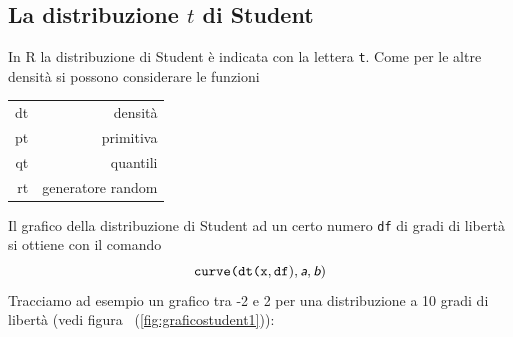 \documentclass[onecolumn,11pt]{book}
\newcommand{\varia}[1]{\textsl{\textsf{#1}}}
\begin{document}
\subsection{La distribuzione $t$ di Student}
In \textsf{R} la distribuzione di Student \`e indicata con la lettera  \texttt{t}.  Come per le altre densit\`a  si possono considerare le funzioni\vskip5pt
\begin{tabular}{|r|r |}
\hline
dt  &densit\`a\\
pt  &primitiva\\
qt & quantili\\
rt  &generatore random\\
\hline
\end{tabular}
\vskip10pt
Il grafico della distribuzione di Student ad un certo numero \texttt{df} di gradi di libert\`a  si ottiene con il comando
\begin{equation*}
\texttt{curve(dt(x},\texttt{df}),\varia{a},\varia{b})
\end{equation*}
Tracciamo ad esempio un grafico tra -2 e 2 per una distribuzione a 10 gradi di libert\`a (vedi figura ~(\ref{fig:graficostudent1})):
\end{document}
